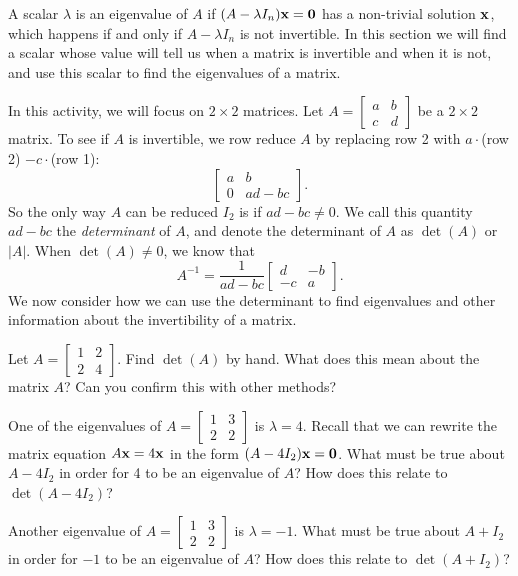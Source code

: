 A scalar $\lambda$ is an eigenvalue of $A$ if $(A - \lambda I_n)\mathbf{x}=\mathbf{0}$ has a non-trivial solution $\mathbf{x}$, which happens if and only if $A-\lambda I_n$ is not invertible. In this section we will find a scalar whose value will tell us when a matrix is invertible and when it is not, and use this scalar to find the eigenvalues of a matrix. 


\begin{pa} \label{pa:4_a} In this activity, we will focus on $2\times 2$ matrices. Let $A = \left[ \begin{array}{cc} a&b \\ c&d \end{array} \right]$ be a $2\times 2$ matrix. To see if $A$ is invertible, we row reduce $A$ by replacing row 2 with $a\cdot $(row 2) $- c \cdot $(row 1):
\[\left[ \begin{array}{cc} a&b \\ 0&ad-bc \end{array} \right].\]
So the only way $A$ can be reduced $I_2$ is if $ad - bc \neq 0$. We call this quantity $ad-bc$ the \emph{determinant} of $A$, and denote the determinant of $A$ as $\det(A)$ or $|A|$. When $\det(A)\neq 0$, we know that 
\[A^{-1} = \frac{1}{ad-bc} \left[ \begin{array}{rr} d&-b \\ -c&a \end{array} \right].\]
We now consider how we can use the determinant to find eigenvalues and other information about the invertibility of a matrix. 
\be
\item Let $A = \left[ \begin{array}{cc} 1&2 \\ 2&4 \end{array} \right]$. Find $\det(A)$ by hand. What does this mean about the matrix $A$? Can you confirm this with other methods? 



\item One of the eigenvalues of $A=\left[ \begin{array}{cc} 1&3 \\ 2&2 \end{array} \right]$ is $\lambda=4$. Recall that we can rewrite the matrix equation $A\mathbf{x}=4\mathbf{x}$ in the form $(A-4I_2) \mathbf{x} = \mathbf{0}$. What must be true about $A-4I_2$ in order for 4 to be an eigenvalue of $A$? How does this relate to $\det(A-4I_2)$? 


\item Another eigenvalue of $A=\left[ \begin{array}{cc} 1&3 \\ 2&2 \end{array} \right]$ is $\lambda=-1$. What must be true about $A+I_2$ in order for $-1$ to be an eigenvalue of $A$? How does this relate to $\det(A+I_2)$? 




\end{pa}
